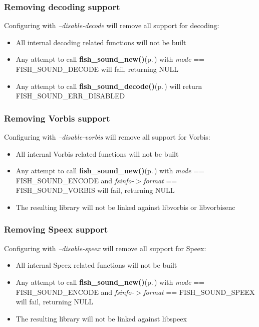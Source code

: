 \subsubsection{Removing decoding support}\label{group__configuration_no_decode}
Configuring with {\em --disable-decode\/} will remove all support for decoding:\begin{itemize}
\item All internal decoding related functions will not be built\item Any attempt to call {\bf fish\_\-sound\_\-new()}{\rm (p.\,\pageref{fishsound_8h_a4})} with {\em mode\/} == FISH\_\-SOUND\_\-DECODE will fail, returning NULL\item Any attempt to call {\bf fish\_\-sound\_\-decode()}{\rm (p.\,\pageref{fishsound_8h_a7})} will return FISH\_\-SOUND\_\-ERR\_\-DISABLED\end{itemize}
\subsubsection{Removing Vorbis support}\label{group__configuration_no_vorbis}
Configuring with {\em --disable-vorbis\/} will remove all support for Vorbis:\begin{itemize}
\item All internal Vorbis related functions will not be built\item Any attempt to call {\bf fish\_\-sound\_\-new()}{\rm (p.\,\pageref{fishsound_8h_a4})} with {\em mode\/} == FISH\_\-SOUND\_\-ENCODE and {\em fsinfo-$>$format\/} == FISH\_\-SOUND\_\-VORBIS will fail, returning NULL\item The resulting library will not be linked against libvorbis or libvorbisenc\end{itemize}
\subsubsection{Removing Speex support}\label{group__configuration_no_speex}
Configuring with {\em --disable-speex\/} will remove all support for Speex:\begin{itemize}
\item All internal Speex related functions will not be built\item Any attempt to call {\bf fish\_\-sound\_\-new()}{\rm (p.\,\pageref{fishsound_8h_a4})} with {\em mode\/} == FISH\_\-SOUND\_\-ENCODE and {\em fsinfo-$>$format\/} == FISH\_\-SOUND\_\-SPEEX will fail, returning NULL\item The resulting library will not be linked against libspeex\end{itemize}
